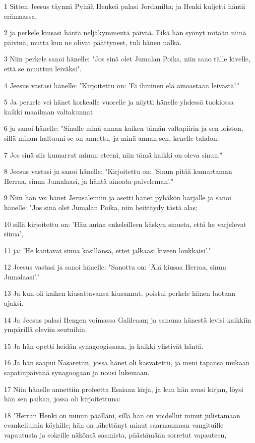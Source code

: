 \par 1 Sitten Jeesus täynnä Pyhää Henkeä palasi Jordanilta; ja Henki kuljetti häntä erämaassa,
\par 2 ja perkele kiusasi häntä neljäkymmentä päivää. Eikä hän syönyt mitään niinä päivinä, mutta kun ne olivat päättyneet, tuli hänen nälkä.
\par 3 Niin perkele sanoi hänelle: "Jos sinä olet Jumalan Poika, niin sano tälle kivelle, että se muuttuu leiväksi".
\par 4 Jeesus vastasi hänelle: "Kirjoitettu on: 'Ei ihminen elä ainoastaan leivästä'."
\par 5 Ja perkele vei hänet korkealle vuorelle ja näytti hänelle yhdessä tuokiossa kaikki maailman valtakunnat
\par 6 ja sanoi hänelle: "Sinulle minä annan kaiken tämän valtapiirin ja sen loiston, sillä minun haltuuni se on annettu, ja minä annan sen, kenelle tahdon.
\par 7 Jos sinä siis kumarrut minun eteeni, niin tämä kaikki on oleva sinun."
\par 8 Jeesus vastasi ja sanoi hänelle: "Kirjoitettu on: 'Sinun pitää kumartaman Herraa, sinun Jumalaasi, ja häntä ainoata palveleman'."
\par 9 Niin hän vei hänet Jerusalemiin ja asetti hänet pyhäkön harjalle ja sanoi hänelle: "Jos sinä olet Jumalan Poika, niin heittäydy tästä alas;
\par 10 sillä kirjoitettu on: 'Hän antaa enkeleilleen käskyn sinusta, että he varjelevat sinua',
\par 11 ja: 'He kantavat sinua käsillänsä, ettet jalkaasi kiveen loukkaisi'."
\par 12 Jeesus vastasi ja sanoi hänelle: "Sanottu on: 'Älä kiusaa Herraa, sinun Jumalaasi'."
\par 13 Ja kun oli kaiken kiusattavansa kiusannut, poistui perkele hänen luotaan ajaksi.
\par 14 Ja Jeesus palasi Hengen voimassa Galileaan; ja sanoma hänestä levisi kaikkiin ympärillä oleviin seutuihin.
\par 15 Ja hän opetti heidän synagoogissaan, ja kaikki ylistivät häntä.
\par 16 Ja hän saapui Nasaretiin, jossa hänet oli kasvatettu, ja meni tapansa mukaan sapatinpäivänä synagoogaan ja nousi lukemaan.
\par 17 Niin hänelle annettiin profeetta Esaiaan kirja, ja kun hän avasi kirjan, löysi hän sen paikan, jossa oli kirjoitettuna:
\par 18 "Herran Henki on minun päälläni, sillä hän on voidellut minut julistamaan evankeliumia köyhille; hän on lähettänyt minut saarnaamaan vangituille vapautusta ja sokeille näkönsä saamista, päästämään sorretut vapauteen,
